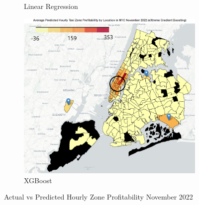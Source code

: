 \documentclass[11pt]{article}
\begin{document}
\begin{figure}[h]
\begin{subfigure}{.36\textwidth}
    \caption{Linear Regression}
    \label{3b}
\end{subfigure}
\begin{subfigure}{.36\textwidth}
    \centering
    \includegraphics[width=1\linewidth]{plots/modelling_map_XGB_edit.png}  
    \caption{XGBoost}
    \label{3c}
\end{subfigure}
\caption{Actual vs Predicted Hourly Zone Profitability November 2022}
\label{3}
\end{figure}

\pagebreak
\end{document}
